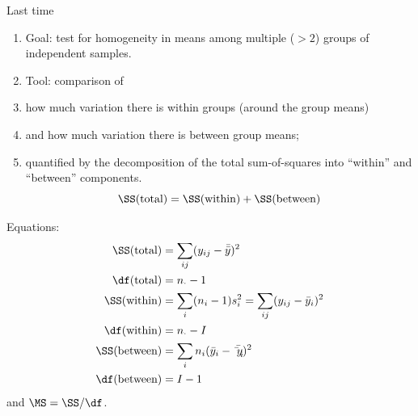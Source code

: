 %
%
%



\subtitle{and two-way ANOVA}

\date{21 November 2013}




\begin{frame}
  \maketitle
\end{frame}



\begin{frame}{Last time}
  \begin{enumerate}
      \item Goal: test for homogeneity in means among multiple ($>2$) groups of independent samples.
      \item Tool: comparison of 
      \item how much variation there is within groups (around the group means)
      \item and how much variation there is between group means;
      \item quantified by the decomposition of the total sum-of-squares into ``within'' and ``between'' components.
          \[ 
       \SS(\text{total})  = \SS(\text{within}) + \SS(\text{between})  
   \]
  \end{enumerate}

  Equations:
    \begin{align*}
        \SS(\text{total}) &= \sum_{ij} (y_{ij} - \bar {\bar y} )^2 \\
      \df(\text{total}) &= n_\cdot - 1 \\
      \SS(\text{within}) &= \sum_{i} (n_i-1) s_i^2 = \sum_{ij} (y_{ij}-\bar y_i)^2 \\
      \df(\text{within}) &= n_\cdot - I \\
      \SS(\text{between}) &= \sum_{i} n_i (\bar y_i - \bar{\bar y_i})^2 \\
      \df(\text{between}) &= I - 1 \\
    \end{align*}
    and $\MS = \SS / \df$.
\end{frame}


